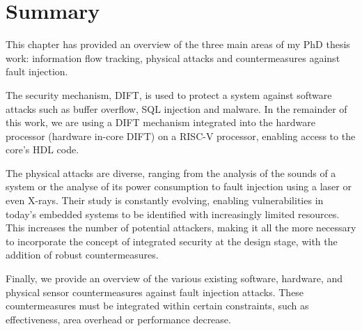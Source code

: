 \section{Summary}
This chapter has provided an overview of the three main areas of my PhD thesis work: information flow tracking, physical attacks and countermeasures against fault injection.

The security mechanism, DIFT, is used to protect a system against software attacks such as buffer overflow, SQL injection and malware. In the remainder of this work, we are using a DIFT mechanism integrated into the hardware processor (hardware in-core DIFT) on a RISC-V processor, enabling access to the core's HDL code.

The physical attacks are diverse, ranging from the analysis of the sounds of a system or the analyse of its power consumption to fault injection using a laser or even X-rays. Their study is constantly evolving, enabling vulnerabilities in today's embedded systems to be identified with increasingly limited resources. This increases the number of potential attackers, making it all the more necessary to incorporate the concept of integrated security at the design stage, with the addition of robust countermeasures.

Finally, we provide an overview of the various existing software, hardware, and physical sensor countermeasures against fault injection attacks. These countermeasures must be integrated within certain constraints, such as effectiveness, area overhead or performance decrease.

